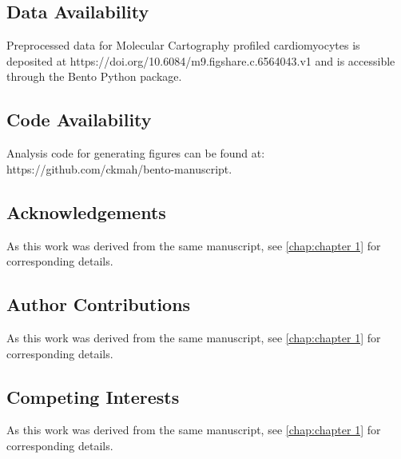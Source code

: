 \subsection{Data Availability}
Preprocessed data for Molecular Cartography profiled cardiomyocytes is deposited at https://doi.org/10.6084/m9.figshare.c.6564043.v1 and is accessible through the Bento Python package. 

\subsection{Code Availability}
Analysis code for generating figures can be found at: https://github.com/ckmah/bento-manuscript.

\subsection{Acknowledgements}

As this work was derived from the same manuscript, see \ref{chap:chapter 1} for corresponding details.

\subsection{Author Contributions}
As this work was derived from the same manuscript, see \ref{chap:chapter 1} for corresponding details.

\subsection{Competing Interests}
As this work was derived from the same manuscript, see \ref{chap:chapter 1} for corresponding details.
